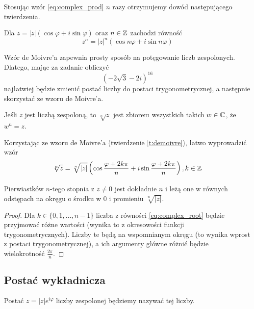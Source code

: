 Stosując wzór \ref{eq:complex_prod} $n$ razy otrzymujemy dowód następującego twierdzenia.

\begin{theorem}
    \label{t:demoivre}
    Dla $z = |z|(\cos\varphi + i\sin\varphi)$ oraz $n \in \mathbb Z$ zachodzi równość
    $$ z^n = |z|^n(\cos n\varphi + i\sin n\varphi) $$
\end{theorem}

Wzór de Moivre'a zapewnia prosty sposób na potęgowanie liczb zespolonych. Dlatego, mając za zadanie obliczyć
$$ (-2\sqrt{3} - 2i)^{16} $$
najłatwiej będzie zmienić postać liczby do postaci trygonometrycznej, a następnie skorzystać ze wzoru de Moivre'a.

\begin{definition}
    Jeśli $z$ jest liczbą zespoloną, to $\sqrt[n]{z}$ jest zbiorem wszystkich takich $w \in \mathbb C$, że $w^n = z$.
\end{definition}

Korzystając ze wzoru de Moivre'a (twierdzenie \ref{t:demoivre}), łatwo wyprowadzić wzór
\begin{equation}
    \label{eq:complex_root}
    \sqrt[n]{z} = \sqrt[n]{|z|}\left(\cos\frac{\varphi + 2k\pi}{n} + i\sin\frac{\varphi + 2k\pi}{n}\right), k \in \mathbb Z
\end{equation}

\begin{fact}
    Pierwiastków $n$-tego stopnia z $z \neq 0$ jest dokładnie $n$ i leżą one w równych odstępach na okręgu o środku w $0$ i promieniu $\sqrt[n]{|z|}$.
\end{fact}
\begin{proof}
    Dla $k \in \{0, 1, \ldots, n-1\}$ liczba z równości \ref{eq:complex_root} będzie przyjmować różne wartości (wynika to z okresowości funkcji trygonometrycznych). Liczby te będą na wspomnianym okręgu (to wynika wprost z postaci trygonometrycznej), a ich argumenty główne różnić będzie wielokrotność $\frac{2\pi}{n}$.
\end{proof}

\subsection{Postać wykładnicza}
Postać $z = |z|e^{i\varphi}$ liczby zespolonej będziemy nazywać  tej liczby.

